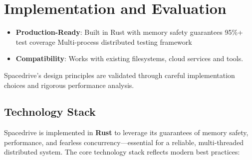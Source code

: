 \documentclass[sigconf]{acmart}
\begin{document}
\section{Implementation and Evaluation}

\begin{keytakeaways}
\begin{itemize}[noitemsep, topsep=0pt]
\item \textbf{Production-Ready}: Built in Rust with memory safety guarantees \textbullet{} 95\%+ test coverage \textbullet{} Multi-process distributed testing framework
\item \textbf{Compatibility}: Works with existing filesystems, cloud services and tools.
\end{itemize}
\end{keytakeaways}

Spacedrive's design principles are validated through careful implementation choices and rigorous performance analysis.

\subsection{Technology Stack}

\appendix

Spacedrive is implemented in \textbf{Rust} to leverage its guarantees of memory safety, performance, and fearless concurrency---essential for a reliable, multi-threaded distributed system. The core technology stack reflects modern best practices:
\end{document}
